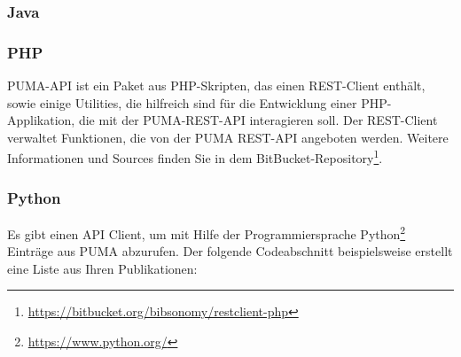 \subsubsection{Java}    


\subsubsection{PHP}
PUMA-API ist ein Paket aus PHP-Skripten, das einen REST-Client enthält, sowie einige Utilities, die hilfreich sind für die Entwicklung einer PHP-Applikation, die mit der PUMA-REST-API interagieren soll. Der REST-Client verwaltet Funktionen, die von der PUMA REST-API angeboten werden.
\newline
Weitere Informationen und Sources finden Sie in dem BitBucket-Repository\footnote{\url{https://bitbucket.org/bibsonomy/restclient-php}}.  

\subsubsection{Python}
Es gibt einen API Client, um mit Hilfe der Programmiersprache Python\footnote{\url{https://www.python.org/}} Einträge aus PUMA abzurufen. Der folgende Codeabschnitt beispielsweise erstellt eine Liste aus Ihren Publikationen:

 


